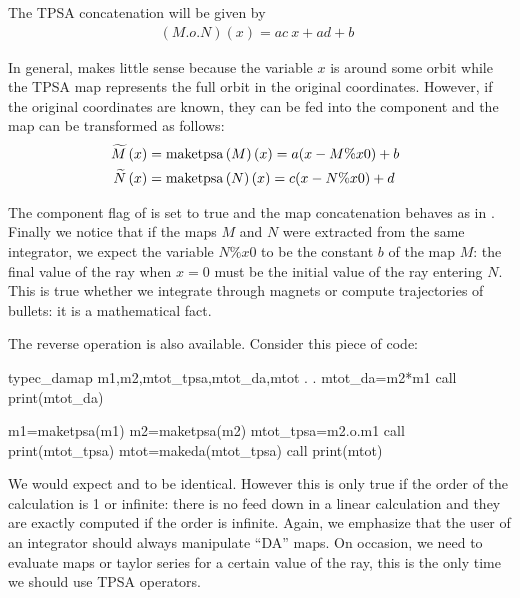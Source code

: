 \documentclass[english,12pt,article]{article} %
\begin{document}
{{{The TPSA concatenation will be given by
%
\begin{align}\left({M.o.N}\right)(x)=
ac\ x+ad+b~~\label{conco}\end{align}

In general,  makes little sense because the variable $x$ is around some orbit while the TPSA map represents the full orbit in the original coordinates. However, if the original coordinates are known, they can be fed into the  component  and the map can be transformed as follows:
%
\begin{align}\widetilde{M}\left({x}\right)&=
{\rm m}{\rm a}{\rm k}{\rm e}{\rm t}{\rm p}{\rm s}{\rm a}\left({M}\right)(x)=
a(x-M\%x0)+b~~\nonumber \\
\widetilde{N}\left({x}\right)&=
{\rm m}{\rm a}{\rm k}{\rm e}{\rm t}{\rm p}{\rm s}{\rm a}\left({N}\right)(x)=
c(x-N\%x0)+d~~\label{maketpsa}\end{align}

The component flag  of  is set to true and the map concatenation behaves as in .  Finally we notice that if the maps $M$ and $N$ were extracted from the same integrator, we expect the variable $N\%x0$ to be the constant $b$ of the map $M$: the final value of the ray when $x=0$ must be the initial value of the ray entering  $N$. This is true whether we integrate through magnets or compute trajectories of bullets: it is a mathematical fact.

The reverse operation is also available. Consider this piece of code:


\begin{code}
type{c_damap} m1,m2,mtot_tpsa,mtot_da,mtot
    .
    .
mtot_da=m2*m1
call print(mtot_da)

m1=maketpsa(m1)
m2=maketpsa(m2)
mtot_tpsa=m2.o.m1
call print(mtot_tpsa)
mtot=makeda(mtot_tpsa)
call print(mtot)
\end{code}
    
We would expect  and  to be identical. However this is only true if the order of the calculation is 1 or infinite: there is no feed down in a linear calculation and they are exactly computed if the order is infinite. 
Again, we emphasize that the user of an integrator should always manipulate ``DA'' maps. On occasion, we need to evaluate maps or taylor series for a certain value of the ray, this is the only time we should use TPSA operators.

}}}
\end{document}
